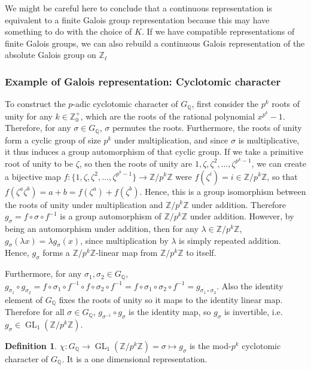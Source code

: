 \documentclass{article}
\theoremstyle{definition}
\newtheorem{definition}{Definition}[section]
\theoremstyle{definition}
\theoremstyle{definition}
\newcommand{\Z}{\mathbb{Z}}
\newcommand{\Q}{\mathbb{Q}}
\begin{document}
We might be careful here to conclude that a continuous representation is equivalent to a finite Galois group representation because this may have something to do with the choice of $K$.
\newline\newline
If we have compatible representations of finite Galois groups, we can also rebuild a continuous Galois representation of the absolute Galois group on $\Z_\ell$


\subsubsection{Example of Galois representation: Cyclotomic character}

To construct the $p$-adic cyclotomic character of $G_\Q$, first consider the $p^k$ roots of unity for any $k\in\Z^+_0$, which are the roots of the rational polynomial $x^{p^k}-1$. Therefore, for any $\sigma\in G_\Q$, $\sigma$ permutes the roots. Furthermore, the roots of unity form a cyclic group of size $p^k$ under multiplication, and since $\sigma$ is multiplicative, it thus induces a group automorphism of that cyclic group. If we take a primitive root of unity to be $\zeta$, so then the roots of unity are $1,\zeta,\zeta^2,\dots,\zeta^{p^k-1}$, we can create a bijective map $f:\{1,\zeta,\zeta^2,\dots,\zeta^{p^k-1}\}\to\Z/p^k\Z$ were $f(\zeta^i)=i\in\Z/p^k\Z$, so that $f(\zeta^a\zeta^b)=a+b=f(\zeta^a)+f(\zeta^b)$. Hence, this is a group isomorphism between the roots of unity under multiplication and $\Z/p^k\Z$ under addition. Therefore $g_\sigma=f\circ \sigma\circ f^{-1}$ is a group automorphism of $\Z/p^k\Z$ under addition. However, by being an automorphism under addition, then for any $\lambda\in\Z/p^k\Z$, $g_\sigma(\lambda x)=\lambda g_\sigma(x)$, since multiplication by $\lambda$ is simply repeated addition. Hence, $g_\sigma$ forms a $\Z/p^k\Z$-linear map from $\Z/p^k\Z$ to itself. 

Furthermore, for any $\sigma_1,\sigma_2\in G_\Q$, $g_{\sigma_1}\circ g_{\sigma_2}=f\circ \sigma_1\circ f^{-1}\circ f\circ \sigma_2\circ f^{-1} = f\circ \sigma_1\circ\sigma_2\circ f^{-1}=g_{\sigma_1\circ\sigma_2}$. Also the identity element of $G_\Q$ fixes the roots of unity so it maps to the identity linear map. Therefore for all $\sigma\in G_\Q$, $g_{\sigma^{-1}}\circ g_\sigma$ is the identity map, so $g_\sigma$ is invertible, i.e. $g_\sigma\in\operatorname{GL}_1(\Z/p^k\Z)$.
\begin{definition}
    $\chi:G_\Q\to\operatorname{GL}_1(\Z/p^k\Z)=\sigma\mapsto g_\sigma$ is the mod-$p^k$ cyclotomic character of $G_\Q$. It is a one dimensional representation.
\end{definition}
\end{document}
